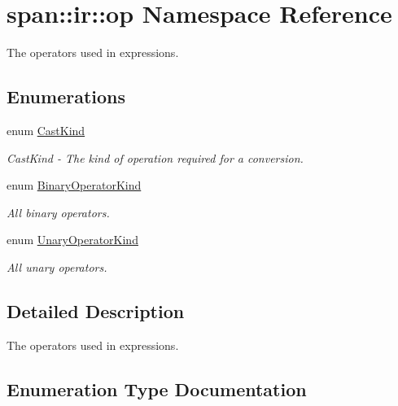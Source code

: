 \hypertarget{namespacespan_1_1ir_1_1op}{}\section{span\+:\+:ir\+:\+:op Namespace Reference}
\label{namespacespan_1_1ir_1_1op}


The operators used in expressions.  


\subsection*{Enumerations}
\begin{DoxyCompactItemize}
\item 
enum \hyperlink{namespacespan_1_1ir_1_1op_a04abe430db9937e27dc5df909415002b}{Cast\+Kind} \begin{DoxyCompactList}\small\item\em Cast\+Kind -\/ The kind of operation required for a conversion. \end{DoxyCompactList}
\item 
enum \hyperlink{namespacespan_1_1ir_1_1op_a5741ac4595bea9e1d2821a8bb5d953e3}{Binary\+Operator\+Kind} \begin{DoxyCompactList}\small\item\em All binary operators. \end{DoxyCompactList}
\item 
enum \hyperlink{namespacespan_1_1ir_1_1op_ab88ceb1213c3473d4f5fc848509dd181}{Unary\+Operator\+Kind} \begin{DoxyCompactList}\small\item\em All unary operators. \end{DoxyCompactList}
\end{DoxyCompactItemize}


\subsection{Detailed Description}
The operators used in expressions. 

\subsection{Enumeration Type Documentation}
\mbox{\label{namespacespan_1_1ir_1_1op_a5741ac4595bea9e1d2821a8bb5d953e3}} 
